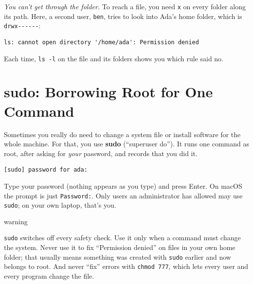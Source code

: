 
\emph{You can't get through the folder.} To reach a file, you need \texttt{x} on every folder along its path. Here, a second user, \texttt{ben}, tries to look into Ada's home folder, which is \texttt{drwx-\/-\/-\/-\/-\/-}:

\begin{codeblock}
\begin{Verbatim}[formatcom=\outputstyle]
ls: cannot open directory '/home/ada': Permission denied
\end{Verbatim}
\end{codeblock}

Each time, \texttt{ls\ -l} on the file and its folders shows you which rule said no.

\section{sudo: Borrowing Root for One Command}\label{03-files-folders-and-who-may-touch-them:sudo-borrowing-root-for-one-command}

Sometimes you really do need to change a system file or install software for the whole machine. For that, you use \textbf{sudo} (``superuser do''). It runs one command as root, after asking for \emph{your} password, and records that you did it.

\begin{codeblock}

\begin{Shaded}
\begin{Highlighting}[]
\end{Highlighting}
\end{Shaded}

\end{codeblock}

\begin{codeblock}
\begin{Verbatim}[formatcom=\outputstyle]
[sudo] password for ada:
\end{Verbatim}
\end{codeblock}

Type your password (nothing appears as you type) and press Enter. On macOS the prompt is just \texttt{Password:}. Only users an administrator has allowed may use \texttt{sudo}; on your own laptop, that's you.

\begin{callout}{warning}

\texttt{sudo} switches off every safety check. Use it only when a command must change the system. Never use it to fix ``Permission denied'' on files in your own home folder; that usually means something was created with \texttt{sudo} earlier and now belongs to root. And never ``fix'' errors with \texttt{chmod\ 777}, which lets every user and every program change the file.

\end{callout}

